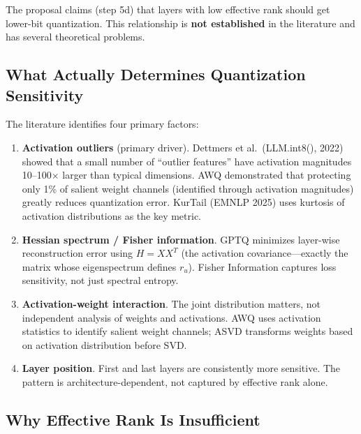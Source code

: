 \documentclass[11pt,a4paper]{article}
\begin{document}
\begin{warningbox}
The proposal claims (step 5d) that layers with low effective rank should get lower-bit quantization. This relationship is \textbf{not established} in the literature and has several theoretical problems.
\end{warningbox}

\subsection{What Actually Determines Quantization Sensitivity}

The literature identifies four primary factors:

\begin{enumerate}
    \item \textbf{Activation outliers} (primary driver). Dettmers et al.\ (LLM.int8(), 2022) showed that a small number of ``outlier features'' have activation magnitudes 10--100$\times$ larger than typical dimensions. AWQ \cite{lin2023awq} demonstrated that protecting only 1\% of salient weight channels (identified through activation magnitudes) greatly reduces quantization error. KurTail (EMNLP 2025) uses kurtosis of activation distributions as the key metric.

    \item \textbf{Hessian spectrum / Fisher information}. GPTQ \cite{frantar2022gptq} minimizes layer-wise reconstruction error using $H = XX^T$ (the activation covariance---exactly the matrix whose eigenspectrum defines $r_u$). Fisher Information captures loss sensitivity, not just spectral entropy.

    \item \textbf{Activation-weight interaction}. The joint distribution matters, not independent analysis of weights and activations. AWQ uses activation statistics to identify salient weight channels; ASVD \cite{yuan2023asvd} transforms weights based on activation distribution before SVD.

    \item \textbf{Layer position}. First and last layers are consistently more sensitive. The pattern is architecture-dependent, not captured by effective rank alone.
\end{enumerate}

\subsection{Why Effective Rank Is Insufficient}
\end{document}
